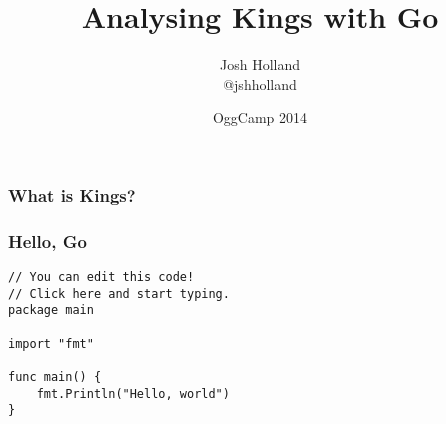 \documentclass{beamer}
\title{Analysing Kings with Go}
\author[@jshholland]{Josh Holland \\ @jshholland}
\date{OggCamp 2014}
\begin{document}
\frame{\titlepage}

\begin{frame}
\frametitle{What is Kings?}
\end{frame}

\begin{frame}[fragile]
\frametitle{Hello, Go}

\begin{verbatim}
// You can edit this code!
// Click here and start typing.
package main

import "fmt"

func main() {
    fmt.Println("Hello, world")
}
\end{verbatim}

\end{frame}
\end{document}
